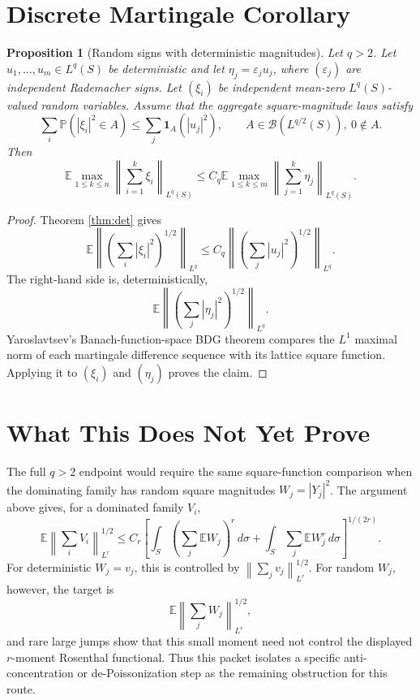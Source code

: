 \documentclass[11pt]{article}
\newtheorem{proposition}{Proposition}
\newcommand{\E}{\mathbb E}
\newcommand{\Pp}{\mathbb P}
\newcommand{\cB}{\mathcal B}
\newcommand{\norm}[1]{\left\lVert #1\right\rVert}
\begin{document}
\section*{Discrete Martingale Corollary}

\begin{proposition}[Random signs with deterministic magnitudes]
\label{prop:signs}
Let \(q>2\).  Let \(u_1,\ldots,u_m\in L^q(S)\) be deterministic and let
\(\eta_j=\varepsilon_j u_j\), where \((\varepsilon_j)\) are independent
Rademacher signs.  Let \((\xi_i)\) be independent mean-zero \(L^q(S)\)-valued
random variables.  Assume that the aggregate square-magnitude laws satisfy
\[
  \sum_i \Pp(|\xi_i|^2\in A)
  \le
  \sum_j \mathbf 1_A(|u_j|^2),
  \qquad A\in\cB(L^{q/2}(S)),\ 0\notin A.
\]
Then
\[
   \E\max_{1\le k\le n}
      \left\|\sum_{i=1}^k \xi_i\right\|_{L^q(S)}
   \le
   C_q
   \E\max_{1\le k\le m}
      \left\|\sum_{j=1}^k \eta_j\right\|_{L^q(S)}.
\]
\end{proposition}

\begin{proof}
Theorem \ref{thm:det} gives
\[
  \E\left\|\left(\sum_i|\xi_i|^2\right)^{1/2}\right\|_{L^q}
  \le
  C_q
  \left\|\left(\sum_j|u_j|^2\right)^{1/2}\right\|_{L^q}.
\]
The right-hand side is, deterministically,
\[
  \E\left\|\left(\sum_j|\eta_j|^2\right)^{1/2}\right\|_{L^q}.
\]
Yaroslavtsev's Banach-function-space BDG theorem
\cite[Theorem 4.32 and Proposition 4.33]{Yaroslavtsev2018} compares the
\(L^1\) maximal norm of each martingale difference sequence with its lattice
square function.  Applying it to \((\xi_i)\) and \((\eta_j)\) proves the
claim.
\end{proof}

\section*{What This Does Not Yet Prove}

The full \(q>2\) endpoint would require the same square-function comparison
when the dominating family has random square magnitudes \(W_j=|Y_j|^2\).  The
argument above gives, for a dominated family \(V_i\),
\[
  \E\norm{\sum_i V_i}_{L^r}^{1/2}
  \le
  C_r
  \left[
      \int_S
      \left(\sum_j \E W_j\right)^r\,d\sigma
      +
      \int_S\sum_j \E W_j^r\,d\sigma
  \right]^{1/(2r)}.
\]
For deterministic \(W_j=v_j\), this is controlled by
\(\norm{\sum_j v_j}_{L^r}^{1/2}\).  For random \(W_j\), however, the target is
\[
  \E\norm{\sum_j W_j}_{L^r}^{1/2},
\]
and rare large jumps show that this small moment need not control the
displayed \(r\)-moment Rosenthal functional.  Thus this packet isolates a
specific anti-concentration or de-Poissonization step as the remaining
obstruction for this route.
\end{document}
